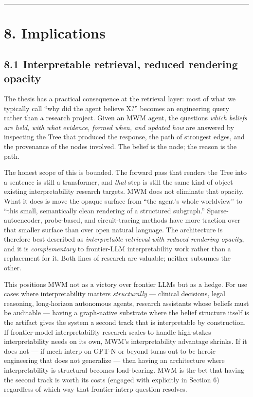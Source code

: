 \documentclass[12pt]{article}
\begin{document}
\begin{center}\rule{0.5\linewidth}{0.5pt}\end{center}

\section{8. Implications}\label{implications}

\subsection{8.1 Interpretable retrieval, reduced rendering opacity}\label{interpretable-retrieval-reduced-rendering-opacity}

The thesis has a practical consequence at the retrieval layer: most of what we typically call ``why did the agent believe X?'' becomes an engineering query rather than a research project. Given an MWM agent, the questions \emph{which beliefs are held, with what evidence, formed when, and updated how} are answered by inspecting the Tree that produced the response, the path of strongest edges, and the provenance of the nodes involved. The belief is the node; the reason is the path.

The honest scope of this is bounded. The forward pass that renders the Tree into a sentence is still a transformer, and \emph{that} step is still the same kind of object existing interpretability research targets. MWM does not eliminate that opacity. What it does is move the opaque surface from ``the agent's whole worldview'' to ``this small, semantically clean rendering of a structured subgraph.'' Sparse-autoencoder, probe-based, and circuit-tracing methods have more traction over that smaller surface than over open natural language. The architecture is therefore best described as \emph{interpretable retrieval with reduced rendering opacity}, and it is \emph{complementary} to frontier-LLM interpretability work rather than a replacement for it. Both lines of research are valuable; neither subsumes the other.

This positions MWM not as a victory over frontier LLMs but as a hedge. For use cases where interpretability matters \emph{structurally} --- clinical decisions, legal reasoning, long-horizon autonomous agents, research assistants whose beliefs must be auditable --- having a graph-native substrate where the belief structure itself is the artifact gives the system a second track that is interpretable by construction. If frontier-model interpretability research scales to handle high-stakes interpretability needs on its own, MWM's interpretability advantage shrinks. If it does not --- if mech interp on GPT-N or beyond turns out to be heroic engineering that does not generalize --- then having an architecture where interpretability is structural becomes load-bearing. MWM is the bet that having the second track is worth its costs (engaged with explicitly in Section 6) regardless of which way that frontier-interp question resolves.
\end{document}
